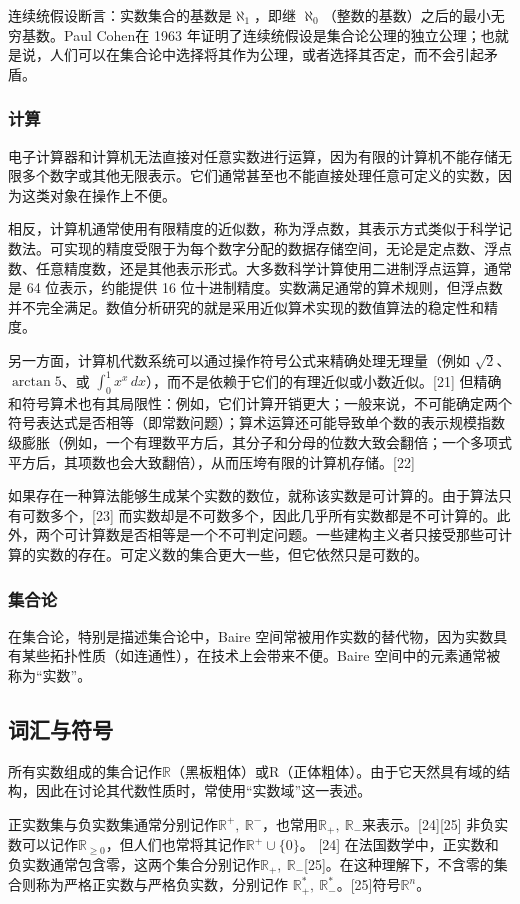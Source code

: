 连续统假设断言：实数集合的基数是$\aleph_{1}$，即继 $\aleph_{0}$（整数的基数）之后的最小无穷基数。Paul Cohen在 1963 年证明了连续统假设是集合论公理的独立公理；也就是说，人们可以在集合论中选择将其作为公理，或者选择其否定，而不会引起矛盾。
\subsubsection{计算}
电子计算器和计算机无法直接对任意实数进行运算，因为有限的计算机不能存储无限多个数字或其他无限表示。它们通常甚至也不能直接处理任意可定义的实数，因为这类对象在操作上不便。

相反，计算机通常使用有限精度的近似数，称为浮点数，其表示方式类似于科学记数法。可实现的精度受限于为每个数字分配的数据存储空间，无论是定点数、浮点数、任意精度数，还是其他表示形式。大多数科学计算使用二进制浮点运算，通常是 64 位表示，约能提供 16 位十进制精度。实数满足通常的算术规则，但浮点数并不完全满足。数值分析研究的就是采用近似算术实现的数值算法的稳定性和精度。

另一方面，计算机代数系统可以通过操作符号公式来精确处理无理量（例如 $\sqrt{2}$、$\arctan 5$、或 $\int_{0}^{1} x^{x}\, dx$），而不是依赖于它们的有理近似或小数近似。[21] 但精确和符号算术也有其局限性：例如，它们计算开销更大；一般来说，不可能确定两个符号表达式是否相等（即常数问题）；算术运算还可能导致单个数的表示规模指数级膨胀（例如，一个有理数平方后，其分子和分母的位数大致会翻倍；一个多项式平方后，其项数也会大致翻倍），从而压垮有限的计算机存储。[22]

如果存在一种算法能够生成某个实数的数位，就称该实数是可计算的。由于算法只有可数多个，[23] 而实数却是不可数多个，因此几乎所有实数都是不可计算的。此外，两个可计算数是否相等是一个不可判定问题。一些建构主义者只接受那些可计算的实数的存在。可定义数的集合更大一些，但它依然只是可数的。
\subsubsection{集合论}
在集合论，特别是描述集合论中，Baire 空间常被用作实数的替代物，因为实数具有某些拓扑性质（如连通性），在技术上会带来不便。Baire 空间中的元素通常被称为“实数”。
\subsection{词汇与符号}
所有实数组成的集合记作$\mathbb{R}$（黑板粗体）或R（正体粗体）。由于它天然具有域的结构，因此在讨论其代数性质时，常使用“实数域”这一表述。

正实数集与负实数集通常分别记作$\mathbb{R}^{+}, \ \mathbb{R}^{-}$，也常用$
\mathbb{R}_{+}, \ \mathbb{R}_{-}$来表示。[24][25] 非负实数可以记作$\mathbb{R}_{\geq 0}$，但人们也常将其记作$\mathbb{R}^{+} \cup \{0\}$。
[24]  在法国数学中，正实数和负实数通常包含零，这两个集合分别记作$\mathbb{R}_{+}, \ \mathbb{R}_{-}$[25]。在这种理解下，不含零的集合则称为严格正实数与严格负实数，分别记作  $\mathbb{R}_{+}^{*}, \ \mathbb{R}_{-}^{*}$。[25]符号$\mathbb{R}^{n}$。

